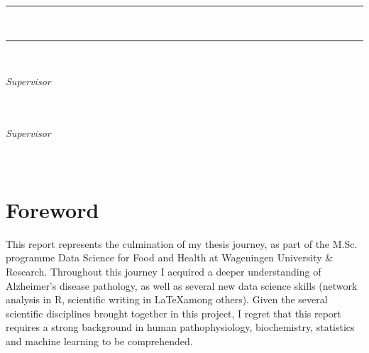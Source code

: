 \documentclass{amsart}
\newcommand{\frontmatter}{
    \pagenumbering{roman}   %
}
\begin{document}
\begin{titlepage}
\vspace{1cm}
\begin{center}
\par
\noindent
\rule[0.2cm]{\linewidth}{1.5pt}
\Huge
\textbf{\thesisTitle}
\vspace{0.2cm}
\LARGE
\par
\noindent
\thesisSubTitle\\
\rule[0.2cm]{\linewidth}{1.5pt}
\Large
\end{center}


\vspace{2cm}
\noindent
\LARGE
\thesisAuthor\\
\vspace{.2 cm}
\small
\par \noindent
\thesisDegree
\par \noindent
\university
\par \noindent
\thesisPlaceDate


\vspace{4cm}
\begin{flushright}
\emph{Supervisor} \\
\textbf{\supervisor} \\
\departmentSUP\\
\universitySUP
\end{flushright}

\vspace{.5cm}
\begin{flushright}
\emph{Supervisor} \\
\textbf{\cosupervisor} \\
\departmentCOSUP \\
\universityCOSUP
\end{flushright}
\end{titlepage}
\frontmatter
\section*{Foreword}
This report represents the culmination of my thesis journey, as part of the M.Sc. programme Data Science for Food and Health at Wageningen University \& Research. Throughout this journey I acquired a deeper understanding of Alzheimer's disease pathology, as well as several new data science skills (network analysis in R, scientific writing in \LaTeX among others). Given the several scientific disciplines brought together in this project, I regret that this report requires a strong background in human pathophysiology, biochemistry, statistics and machine learning to be comprehended.
\end{document}
